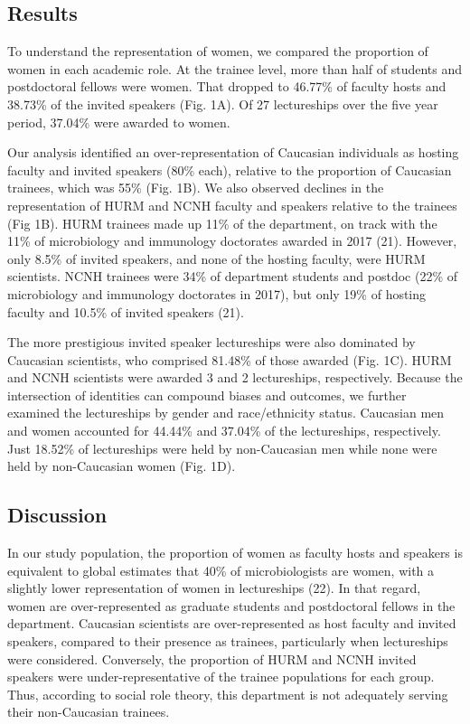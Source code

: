 \documentclass[10pt,]{article}
\begin{document}
\subsection{Results}\label{results}

To understand the representation of women, we compared the proportion of
women in each academic role. At the trainee level, more than half of
students and postdoctoral fellows were women. That dropped to 46.77\% of
faculty hosts and 38.73\% of the invited speakers (Fig. 1A). Of 27
lectureships over the five year period, 37.04\% were awarded to women.

Our analysis identified an over-representation of Caucasian individuals
as hosting faculty and invited speakers (80\% each), relative to the
proportion of Caucasian trainees, which was 55\% (Fig. 1B). We also
observed declines in the representation of HURM and NCNH faculty and
speakers relative to the trainees (Fig 1B). HURM trainees made up 11\%
of the department, on track with the 11\% of microbiology and immunology
doctorates awarded in 2017 (21). However, only 8.5\% of invited
speakers, and none of the hosting faculty, were HURM scientists. NCNH
trainees were 34\% of department students and postdoc (22\% of
microbiology and immunology doctorates in 2017), but only 19\% of
hosting faculty and 10.5\% of invited speakers (21).

The more prestigious invited speaker lectureships were also dominated by
Caucasian scientists, who comprised 81.48\% of those awarded (Fig. 1C).
HURM and NCNH scientists were awarded 3 and 2 lectureships,
respectively. Because the intersection of identities can compound biases
and outcomes, we further examined the lectureships by gender and
race/ethnicity status. Caucasian men and women accounted for 44.44\% and
37.04\% of the lectureships, respectively. Just 18.52\% of lectureships
were held by non-Caucasian men while none were held by non-Caucasian
women (Fig. 1D).

\subsection{Discussion}\label{discussion}

In our study population, the proportion of women as faculty hosts and
speakers is equivalent to global estimates that 40\% of microbiologists
are women, with a slightly lower representation of women in lectureships
(22). In that regard, women are over-represented as graduate students
and postdoctoral fellows in the department. Caucasian scientists are
over-represented as host faculty and invited speakers, compared to their
presence as trainees, particularly when lectureships were considered.
Conversely, the proportion of HURM and NCNH invited speakers were
under-representative of the trainee populations for each group. Thus,
according to social role theory, this department is not adequately
serving their non-Caucasian trainees.
\end{document}
